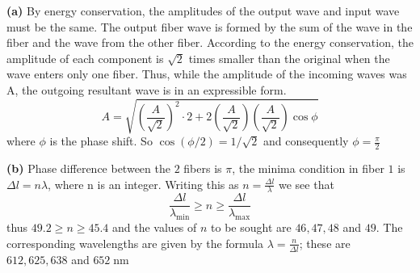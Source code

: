 \begin{custom-simple}[Problem 18]
\textbf{(a)} By energy conservation, the amplitudes of the output wave and input wave must be the same. The output fiber wave is formed by the sum of the wave in the fiber and the wave from the other fiber. According to the energy conservation, the amplitude of each component is $\sqrt 2$ times smaller than the original when the wave enters only one fiber. Thus, while the amplitude of the incoming waves was A, the outgoing resultant wave is in an expressible form.
$$A = \sqrt {\left(\frac {A}{\sqrt 2}\right)^2 \cdot 2 + 2\left(\frac {A}{\sqrt 2}\right) \left(\frac {A}{\sqrt 2}\right)\cos \phi}$$where $\phi$ is the phase shift. So $\cos (\phi/ 2) = 1/\sqrt 2$ and consequently $\phi = \frac {\pi}{2}$
\vspace{5mm}

\textbf{(b)} Phase difference between the $2$ fibers is $\pi$, the minima condition in fiber $1$ is $\Delta l = n\lambda$, where n is an integer. Writing this as $n = \frac{\Delta l}{\lambda}$ we see that
\[\frac{\Delta l}{\lambda_{\text{min}}}\geq n \geq \frac{\Delta l}{\lambda_{\text{max}}}\]thus $49.2 \geq n \geq 45.4$ and the values of $n$ to be sought are $46, 47, 48$ and $49$. The corresponding wavelengths are given by the formula $\lambda = \frac{n}{\Delta l}$; these are $612, 625, 638$ and $652\;\mathrm{nm}$
\end{custom-simple}